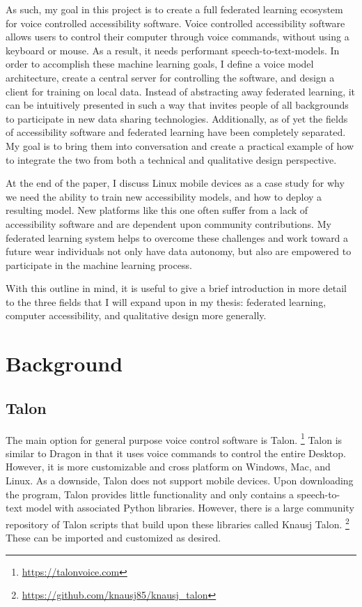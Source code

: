 \documentclass[manuscript,screen,review]{acmart}
\begin{document}
As such, my goal in this project is to create a full federated learning ecosystem for voice controlled accessibility software. Voice controlled accessibility software allows users to control their computer through voice commands, without using a keyboard or mouse. As a result, it needs performant speech-to-text-models. In order to accomplish these machine learning goals, I define a voice model architecture, create a central server for controlling the software, and design a client for training on local data. Instead of abstracting away federated learning, it can be intuitively presented in such a way that invites people of all backgrounds to participate in new data sharing technologies. Additionally, as of yet the fields of accessibility software and federated learning have been completely separated. My goal is to bring them into conversation and create a practical example of how to integrate the two from both a technical and qualitative design perspective.

At the end of the paper, I discuss Linux mobile devices as a case study for why we need the ability to train new accessibility models, and how to deploy a resulting model.  New platforms like this one often suffer from a lack of accessibility software and are dependent upon community contributions.  My federated learning system helps to overcome these challenges  and work toward a future wear individuals not only have data autonomy, but also are empowered to participate in the machine learning process.



With this outline in mind, it is useful to give a brief introduction in more detail to the three fields that I will expand upon in my thesis: federated learning, computer accessibility, and qualitative design more generally.


\section{Background}

\subsection{Talon}

The main option for general purpose voice control software is Talon. \footnote{\url{https://talonvoice.com}} Talon is similar to Dragon in that it uses voice commands to control the entire Desktop. However, it is more customizable and cross platform on Windows, Mac, and Linux. As a downside, Talon does not support mobile devices. Upon downloading the program, Talon provides little functionality and only contains a speech-to-text model with associated Python libraries. However, there is a large community repository of Talon scripts that build upon these libraries called Knausj Talon. \footnote{\url{https://github.com/knausj85/knausj\_talon}} These can be imported and customized as desired.
\end{document}
